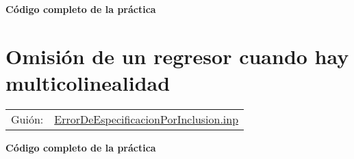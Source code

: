 \documentclass[11pt]{article}
\begin{document}
\vspace{10pt}
\noindent
\textbf{Código completo de la práctica}
\vspace{10pt}

\clearpage



\section{Omisión de un regresor cuando hay multicolinealidad}
\label{sec:org6e83fc9}
\begin{center}
\begin{tabular}{ll}
Guión: & \href{https://github.com/mbujosab/Ectr/tree/master/Practicas/Gretl/scripts/ErrorDeEspecificacionPorInclusion.inp}{ErrorDeEspecificacionPorInclusion.inp}\\[0pt]
\end{tabular}
\end{center}


\vspace{10pt}
\noindent
\textbf{Código completo de la práctica}
\vspace{10pt}

\clearpage
\end{document}
